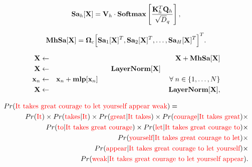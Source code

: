 \documentclass[letterpaper,twoside,openany, titlepage,oldfontcommands,titles,dvipsnames]{memoir}
\begin{document}
\begin{eqnarray}
  \mbox{{\bf Sa}}_{h}[\mathbf{X}] =\mathbf{V}_h\cdot\mbox{\bf Softmax}\left[\frac{\mathbf{K}_h^{T}\mathbf{Q}_h}{\sqrt{D}_{q}}\right],
 \end{eqnarray}

\begin{eqnarray}
  \mbox{{\bf MhSa}}[\mathbf{X}] = \boldsymbol\Omega_{c}\Bigl[\mbox{{\bf Sa}}_{1}[\mathbf{X}]^T,\mbox{{\bf Sa}}_{2}[\mathbf{X}]^T,\ldots,\mbox{{\bf Sa}}_{H}[\mathbf{X}]^T \Bigr]^T.
 \end{eqnarray}

\begin{eqnarray}
  \mathbf{X} &\leftarrow& \mathbf{X} + \mbox{\bf{MhSa}}[\mathbf{X}] \nonumber \\
  \mathbf{X} &\leftarrow& \mbox{\bf{LayerNorm}}[\mathbf{X}] \hspace{3cm}\nonumber\\
  \mathbf{x}_{n} &\leftarrow& \mathbf{x}_{n}+\mbox{\bf{mlp}}[\mathbf{x}_{n}] \hspace{3.6cm}\forall\; n\in\{1,\ldots, N\}\nonumber\\
  \mathbf{X} &\leftarrow& \mbox{\bf{LayerNorm}}[\mathbf{X}],
 \end{eqnarray}

\begin{eqnarray}
  Pr(\mbox{\textcolor{red}{It takes great courage to let yourself appear weak}}) &=&\nonumber\\
  &&\hspace{-8cm}Pr(\mbox{\textcolor{red}{It}})\times Pr(\mbox{\textcolor{red}{takes}}|\mbox{\textcolor{red}{It}})\times Pr(\mbox{\textcolor{red}{great}}|\mbox{\textcolor{red}{It takes}})\times Pr(\mbox{\textcolor{red}{courage}}|\mbox{\textcolor{red}{It takes great}})\times\nonumber \\
  &&\hspace{-8cm}Pr(\mbox{\textcolor{red}{to}}|\mbox{\textcolor{red}{It takes great courage}})\times Pr(\mbox{\textcolor{red}{let}}|\mbox{\textcolor{red}{It takes great courage to}})\times\nonumber\\
  &&\hspace{-8cm}Pr(\mbox{\textcolor{red}{yourself}}|\mbox{\textcolor{red}{It takes great courage to let}})\times\nonumber\\
  &&\hspace{-8cm}Pr(\mbox{\textcolor{red}{appear}}|\mbox{\textcolor{red}{It takes great courage to let yourself}})\times\nonumber\\
  &&\hspace{-8cm}Pr(\mbox{\textcolor{red}{weak}}|\mbox{\textcolor{red}{It takes great courage to let yourself appear}}).
 \end{eqnarray}
\end{document}
